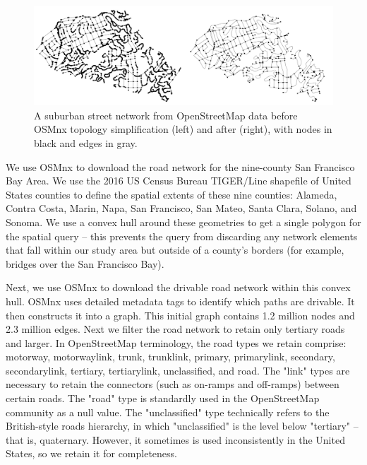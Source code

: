 \begin{figure}[htp]
\center
\includegraphics[width=6.5in]
{graphics/simplification_before_after.png}
\caption{A suburban street network from OpenStreetMap data before OSMnx topology simplification (left) and after (right), with nodes in black and edges in gray.}
\label{fig:simplification_before_after}
\end{figure}

We use OSMnx to download the road network for the nine-county San Francisco Bay Area. We use the 2016 US Census Bureau TIGER/Line shapefile of United States counties to define the spatial extents of these nine counties: Alameda, Contra Costa, Marin, Napa, San Francisco, San Mateo, Santa Clara, Solano, and Sonoma. We use a convex hull around these geometries to get a single polygon for the spatial query – this prevents the query from discarding any network elements that fall within our study area but outside of a county's borders (for example, bridges over the San Francisco Bay).

Next, we use OSMnx to download the drivable road network within this convex hull. OSMnx uses detailed metadata tags to identify which paths are drivable. It then constructs it into a graph. This initial graph contains 1.2 million nodes and 2.3 million edges. Next we filter the road network to retain only tertiary roads and larger. In OpenStreetMap terminology, the road types we retain comprise: motorway, motorway\textunderscore link, trunk, trunk\textunderscore link, primary, primary\textunderscore link, secondary, secondary\textunderscore link, tertiary, tertiary\textunderscore link, unclassified, and road. The "link" types are necessary to retain the connectors (such as on-ramps and off-ramps) between certain roads. The "road" type is standardly used in the OpenStreetMap community as a null value. The "unclassified" type technically refers to the British-style roads hierarchy, in which "unclassified" is the level below "tertiary" – that is, quaternary. However, it sometimes is used inconsistently in the United States, so we retain it for completeness.

